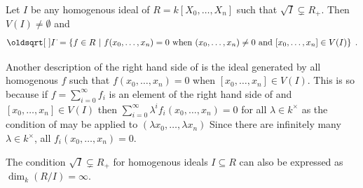 \documentclass[a4paper,parskip=half,numbers=enddot, DIV=12]{scrreprt}
\begin{document}
\begin{prop}
    Let $I$ be any homogenous ideal of $R=k[X_0,\ldots, X_n]$ such that $\sqrt{I}\subsetneq R_+$. Then $V(I)\neq\emptyset$ and 
    \begin{align}\lbl{eq:projectiveRadical}
        \sqrt{I}= \left\{f\in R\st f(x_0,\ldots, x_n) = 0 \text{ when }(x_0,\ldots,x_n)\neq 0\text{ and } [x_0,\ldots, x_n]\in V(I)\right\}\;.
    \end{align}
\end{prop}
\begin{rem*}
    \begin{alphanumerate}
        \item 
            Another description of the right hand side of  is the ideal generated by all homogenous $f$ such that $f(x_0,\ldots,x_n)=0$ when $[x_0,\ldots,x_n]\in V(I)$. This is so because if $f= \sum_{i=0}^\infty f_i$ is an element of the right hand side of  and $[x_0,\ldots, x_n]\in V(I)$ then $\sum_{i=0}^\infty \lambda^i f_i(x_0,\ldots,x_n) = 0$ for all $\lambda\in k^\times$ as the condition of  may be applied to $(\lambda x_0,\ldots, \lambda x_n)$ Since there are infinitely many $\lambda\in k^\times$, all $f_i(x_0,\ldots, x_n) = 0$.
        \item 
            The condition $\sqrt{I}\subsetneq R_+$ for homogenous ideals $I\subseteq R$ can also be expressed as $\dim_k(R/I) = \infty$.
    \end{alphanumerate}
\end{rem*}
\end{document}
